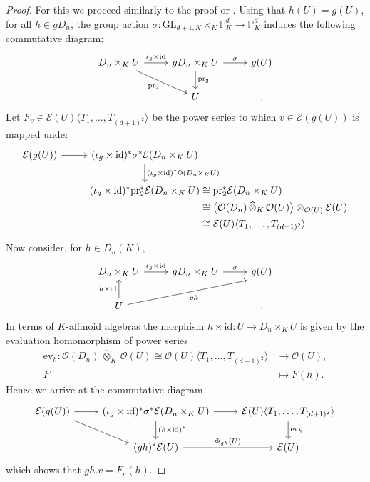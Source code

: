 \documentclass[a4paper, reqno, 10pt]{amsart}
\theoremstyle{definition}
\numberwithin{equation}{section}
\newcommand{\cotimes}[1]{{\,\widehat{\otimes}_{#1}\,}}
\newcommand{\GL}{{\mathrm{GL}}}
\newcommand{\id}{{\mathrm{id}}}
\newcommand{\lra}{\longrightarrow}
\newcommand{\lto}{\longmapsto}
\newcommand{\pr}{{\mathrm{pr}}}
\newcommand{\ra}{\rightarrow}
\newcommand{\BP}{{\mathbb {P}}}
\newcommand{\CE}{{\mathcal {E}}}
\newcommand{\CO}{{\mathcal {O}}}
\begin{document}
\begin{proof}
	
	For this we proceed similarly to the proof or .
	Using that $h(U)=g(U)$, for all $h\in gD_{n}$, the group action $\sigma\colon \GL_{d+1,K} \times_K \BP_K^d \ra \BP_K^d$ induces the following commutative diagram:
	\begin{equation*}
		\begin{tikzcd}
			D_{n} \times_K U \arrow[r, "\iota_g \times \mathrm{id}"] \arrow[rd, "\pr_2"'] & g D_n \times_K U \arrow[r, "\sigma"] \arrow[d, "\pr_2"] & g(U) \\
			&U&.
		\end{tikzcd}
	\end{equation*}
	Let $F_v \in \CE(U)\langle T_1,\ldots, T_{(d+1)^2} \rangle$ be the power series to which $v \in \CE(g(U))$ is mapped under
	\begin{equation*}
		\begin{tikzcd}[,/tikz/column 3/.append style={anchor=base west}]
			\CE(g(U)) \ar[r] & (\iota_g \times \id)^\ast \sigma^\ast \CE(D_n \times_K U) \ar[d, "(\iota_g \times \mathrm{id})^{\ast} \Phi (D_n \times_K U)"] &[-30pt]\\
			& (\iota_g \times \id)^\ast \pr_2^\ast \CE(D_n \times_K U) &[-30pt] \cong \pr_2^\ast \CE(D_n \times_K U) \\[-20pt]
			&&[-30pt]	\cong \big( \CO(D_n) \cotimes{K} \CO(U) \big) \otimes_{\CO(U)} \CE(U) \\[-20pt]
			&&[-30pt] \cong \CE(U) \langle T_1,\ldots,T_{(d+1)^2} \rangle  .
		\end{tikzcd}
	\end{equation*}
	Now consider, for $h \in D_n(K)$,
	\begin{equation*}
		\begin{tikzcd}
			D_n \times_K U \arrow[r, "\iota_g \times \id"] & g D_n \times_K U \arrow[r, "\sigma"] & g(U) \\
			U \arrow[u, "h \times \id"]  \arrow[urr,  "gh"', end anchor = 210] && .
		\end{tikzcd}
	\end{equation*}
	In terms of $K$-affinoid algebras the morphism $h \times \id\colon U \ra D_n \times_K U$ is given by the evaluation homomorphism of power series
	\begin{align*}
		\mathrm{ev}_h \colon \CO(D_n) \cotimes{K} \CO(U) \cong \CO(U) \langle T_1,\ldots,T_{(d+1)^2} \rangle &\lra \CO(U) , \\
		F &\lto F(h) .
	\end{align*}
	Hence we arrive at the commutative diagram 
	\begin{equation*}
		\begin{tikzcd}
			\CE(g(U)) \arrow[r] \arrow[rd, end anchor = 170] & (\iota_g\times\id)^\ast \sigma^\ast \CE(D_n\times_K U) \arrow[d, "(h\times\id)^\ast"] \arrow[r] & \CE(U)\langle T_1,\ldots,T_{(d+1)^2} \rangle \arrow[d, "\mathrm{ev}_h"]\\
			& (gh)^\ast \CE(U) \arrow[r, "\Phi_{gh}(U)"] &\CE(U) 
		\end{tikzcd}
	\end{equation*}
	which shows that $gh.v = F_v(h)$.
	

\end{proof}
\end{document}
